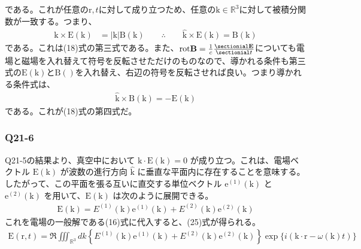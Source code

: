 \documentclass[platex,dvipdfmx,a4paper]{jsarticle}
\newcommand{\hb}[2]{\frac{\sectionial #1}{\sectionial #2}}
\newcommand{\vect}[1]{\boldsymbol{\mathrm{#1}}}
\begin{document}
  である。これが任意の$\vect{r},t$に対して成り立つため、任意の$\vect{k}\in{\mathbb{R}^3}$に対して被積分関数が一致する。つまり、
  \begin{align*}
    \vect{k}\times\vect{E}(\vect{k}) &= |\vect{k}|\vect{B}(\vect{k}) \qquad \therefore \qquad \hat{\vect{k}}\times\vect{E}(\vect{k}) = \vect{B}(\vect{k})
  \end{align*}
  である。これは(18)式の第三式である。また、$\mathrm{rot}\vect{B}=\frac{1}{c}\hb{\vect{E}}{t}$についても電場と磁場を入れ替えて符号を反転させただけのものなので、導かれる条件も第三式の$\vect{E}(\vect{k})$と$\vect{B}(\vect{})$を入れ替え、右辺の符号を反転させれば良い。つまり導かれる条件式は、
  \begin{align*}
    \hat{\vect{k}}\times\vect{B}(\vect{k}) = -\vect{E}(\vect{k})
  \end{align*}
  である。これが(18)式の第四式だ。

  \subsubsection*{Q21-6}
  Q21-5の結果より、真空中において $\vect{k} \cdot \vect{E}(\vect{k}) = 0$ が成り立つ。これは、電場ベクトル $\vect{E}(\vect{k})$ が波数の進行方向 $\hat{\vect{k}}$ に垂直な平面内に存在することを意味する。
  したがって、この平面を張る互いに直交する単位ベクトル $\vect{e}^{(1)}(\vect{k})$ と $\vect{e}^{(2)}(\vect{k})$ を用いて、$\vect{E}(\vect{k})$ は次のように展開できる。
  \begin{align*}
    \vect{E}(\vect{k}) = E^{(1)}(\vect{k})\vect{e}^{(1)}(\vect{k}) + E^{(2)}(\vect{k})\vect{e}^{(2)}(\vect{k})
  \end{align*}
  これを電場の一般解である(16)式に代入すると、(25)式が得られる。
  \begin{align*}
    \vect{E}(\vect{r},t) = \Re \iiint_{\mathbb{R}^3} dk \left\{ E^{(1)}(\vect{k})\vect{e}^{(1)}(\vect{k}) + E^{(2)}(\vect{k})\vect{e}^{(2)}(\vect{k}) \right\} \exp\{i(\vect{k} \cdot \vect{r} - \omega(\vect{k})t)\}
  \end{align*}
\end{document}
